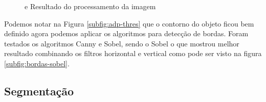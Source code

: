 \begin{figure}[h]
 \centering
   \qquad
   \caption{{} e {} Resultado do processamento da imagem }
  \label{fig:subfiguras}
\end{figure}

Podemos notar na Figura \ref{subfig:adp-thres} que o contorno do objeto ficou bem definido agora podemos aplicar os algoritmos para detecção de bordas. Foram testados os algoritmos  Canny e Sobel, sendo o Sobel o que mostrou melhor resultado combinando os filtros horizontal e vertical como pode ser visto na figura \ref{subfig:bordas-sobel}. 

\subsection{Segmentação}
\label{sec:segmentacao}

